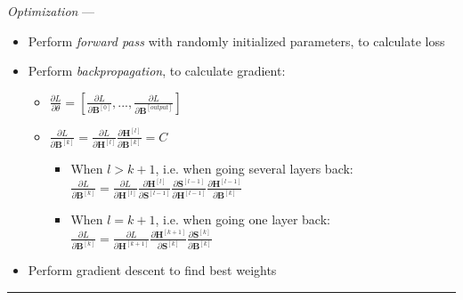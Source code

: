 \emph{Optimization} ---
\begin{itemize}
    \item Perform \emph{forward pass} with randomly initialized parameters, to calculate loss
    \item Perform \emph{backpropagation}, to calculate gradient:
    \begin{itemize}
        \item $\frac{\partial L}{\partial \theta} = [ \frac{\partial L}{\partial \boldsymbol{B}^{[0]}} , ..., \frac{\partial L}{\partial \boldsymbol{B}^{[output]}} ]$
        \item $\frac{\partial L}{\partial \boldsymbol{B}^{[k]} } = \frac{\partial L}{ \partial \boldsymbol{H}^{[l]} } \frac{ \partial \boldsymbol{H}^{[l]} }{ \partial \boldsymbol{B}^{[k]} } = C$
        \begin{itemize}
            \item When $l > k+1$, i.e. when going several layers back: $\frac{\partial L}{\partial \boldsymbol{B}^{[k]} } = \frac{\partial L}{ \partial \boldsymbol{H}^{[l]} }  \frac{ \partial \boldsymbol{H}^{[l]} }{ \partial \boldsymbol{S}^{[l-1]} } \frac{ \partial \boldsymbol{S}^{[l-1]} }{ \partial \boldsymbol{H}^{[l-1]} } \frac{ \partial \boldsymbol{H}^{[l-1]} }{ \partial \boldsymbol{B}^{[k]} }$ 
            \item When $l = k+1$, i.e. when going one layer back: $\frac{\partial L}{\partial \boldsymbol{B}^{[k]} } = \frac{\partial L}{ \partial \boldsymbol{H}^{[k+1]} }  \frac{ \partial \boldsymbol{H}^{[k+1]} }{ \partial \boldsymbol{S}^{[k]} } \frac{ \partial \boldsymbol{S}^{[k]} }{ \partial \boldsymbol{B}^{[k]} }$
        \end{itemize}
    \end{itemize}
    \item Perform gradient descent to find best weights 
\end{itemize}

{\color{lightgray}\hrule height 0.001mm}

